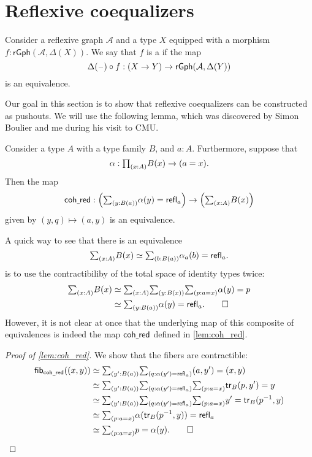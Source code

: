 \section{Reflexive coequalizers}

\begin{defn}
Consider a reflexive graph $\mathcal{A}$ and a type $X$ equipped with a morphism $f:\mathsf{rGph}(\mathcal{A},\Delta(X))$. We say that $f$ is a  if the map
\begin{equation*}
\Delta(\mathord{\hspace{1pt}\text{--}\hspace{1pt}}) \circ f: (X\to Y)\to \mathsf{rGph}(\mathcal{A},\Delta(Y))
\end{equation*}
is an equivalence.
\end{defn}

Our goal in this section is to show that reflexive coequalizers can be constructed as pushouts. We will use the following lemma, which was discovered by Simon Boulier and me during his visit to CMU.

\begin{lem}\label{lem:coh_red}
Consider a type $A$ with a type family $B$, and $a:A$. Furthermore, suppose that
\begin{equation*}
\alpha:\prd{x:A}B(x)\to (a=x).
\end{equation*}
Then the  map
\begin{equation*}
\mathsf{coh\usc{}red} : \Big(\sm{y:B(a)}\alpha(y)=\refl{a}\Big)\to\Big(\sm{x:A}B(x)\Big)
\end{equation*}
given by $(y,q)\mapsto (a,y)$ is an equivalence.
\end{lem}

\begin{rmk}
A quick way to see that there is an equivalence
\begin{equation*}
\sm{x:A}B(x) \eqvsym \sm{b:B(a)} \alpha_{a}(b)=\refl{a}.
\end{equation*}
is to use the contractibiliby of the total space of identity types twice:
\begin{align*}
\sm{x:A}B(x) & \eqvsym \sm{x:A}{y:B(x)}{p:a=x}\alpha(y)=p \\
& \eqvsym \sm{y:B(a)}\alpha(y)=\refl{a}.\qedhere
\end{align*}
However, it is not clear at once that the underlying map of this composite of equivalences is indeed the map $\mathsf{coh\underline{\ }{}red}$ defined in \cref{lem:coh_red}.
\end{rmk}

\begin{proof}[Proof of \cref{lem:coh_red}]
We show that the fibers are contractible:
\begin{align*}
\fib{\mathsf{coh\usc{}red}}{(x,y)} & \eqvsym \sm{y':B(a)}{q:\alpha(y')=\refl{a}} (a,y')=(x,y) \\
& \eqvsym \sm{y':B(a)}{q:\alpha(y')=\refl{a}}{p:a=x} \mathsf{tr}_B(p,y')=y \\
& \eqvsym \sm{y':B(a)}{q:\alpha(y')=\refl{a}}{p:a=x} y'=\mathsf{tr}_B(p^{-1},y) \\
& \eqvsym \sm{p:a=x}\alpha(\mathsf{tr}_B(p^{-1},y))=\refl{a} \\
& \eqvsym \sm{p:a=x}p=\alpha(y).\qedhere
\end{align*}
\end{proof}

